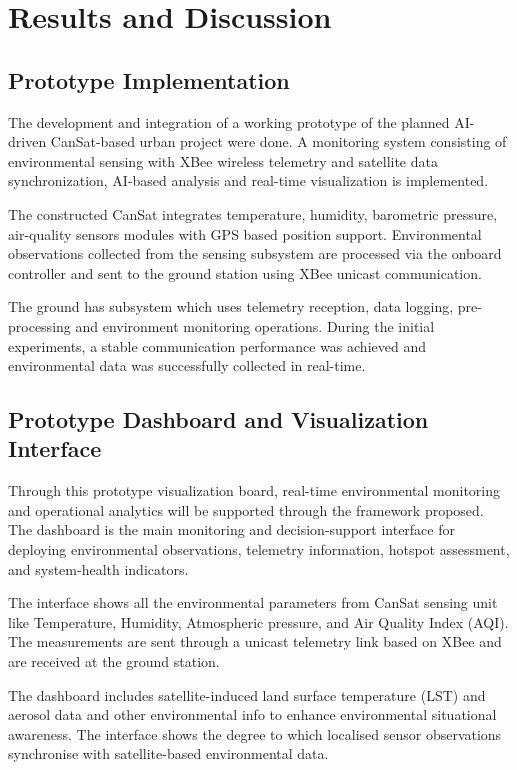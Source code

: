 \documentclass[conference]{IEEEtran}
\begin{document}
\section{Results and Discussion}

\subsection{Prototype Implementation}

The development and integration of a working prototype of the planned AI-driven CanSat-based urban project were done. A monitoring system consisting of environmental sensing with XBee wireless telemetry and satellite data synchronization, AI-based analysis and real-time visualization is implemented.

The constructed CanSat integrates temperature, humidity, barometric pressure, air-quality sensors modules with GPS based position support. Environmental observations collected from the sensing subsystem are processed via the onboard controller and sent to the ground station using XBee unicast communication.

The ground has subsystem which uses telemetry reception, data logging, pre-processing and environment monitoring operations. During the initial experiments, a stable communication performance was achieved and environmental data was successfully collected in real-time.

\vspace{0.3cm}

\subsection{Prototype Dashboard and Visualization Interface}

Through this prototype visualization board, real-time environmental monitoring and operational analytics will be supported through the framework proposed. The dashboard is the main monitoring and decision-support interface for deploying environmental observations, telemetry information, hotspot assessment, and system-health indicators.

The interface shows all the environmental parameters from CanSat sensing unit like Temperature, Humidity, Atmospheric pressure, and Air Quality Index (AQI). The measurements are sent through a unicast telemetry link based on XBee and are received at the ground station.

The dashboard includes satellite-induced land surface temperature (LST) and aerosol data and other environmental info to enhance environmental situational awareness. The interface shows the degree to which localised sensor observations synchronise with satellite-based environmental data. 
\end{document}
